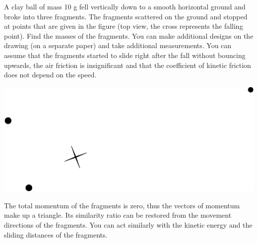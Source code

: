 {\ifEngStatement
A clay ball of mass 10 g fell vertically down to a smooth horizontal ground and broke into three fragments. The fragments scattered on the ground and stopped at points that are given in the figure (top view, the cross represents the falling point). Find the masses of the fragments. You can make additional designs on the drawing (on a separate paper) and take additional measurements. You can assume that the fragments started to slide right after the fall without bouncing upwards, the air friction is insignificant and that the coefficient of kinetic friction does not depend on the speed. 
\begin{center}
\includegraphics[width=0.8\linewidth]{2012-lahg-10-killud}
\end{center}
\fi


\ifEngHint
The total momentum of the fragments is zero, thus the vectors of momentum make up a triangle. Its similarity ratio can be restored from the movement directions of the fragments. You can act similarly with the kinetic energy and the sliding distances of the fragments.
\fi


}
